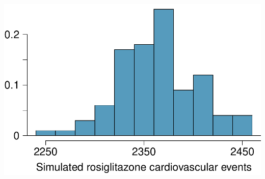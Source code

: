 {\begin{minipage}[c]{0.5\textwidth}
\includegraphics[width = \textwidth]{ch_intro_to_data/figures/eoce/randomization_avandia/randomization_avandia.pdf} \\
\end{minipage}
}{}


